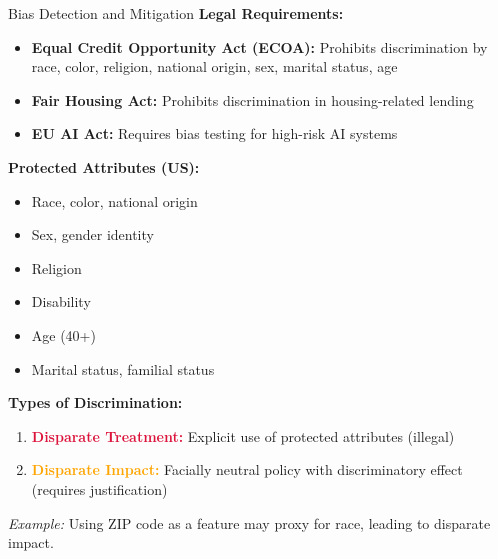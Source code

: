 \begin{frame}{Bias Detection and Mitigation}
\textbf{Legal Requirements:}
\begin{itemize}
\item \textbf{Equal Credit Opportunity Act (ECOA):} Prohibits discrimination by race, color, religion, national origin, sex, marital status, age
\item \textbf{Fair Housing Act:} Prohibits discrimination in housing-related lending
\item \textbf{EU AI Act:} Requires bias testing for high-risk AI systems
\end{itemize}

\vspace{0.3cm}
\textbf{Protected Attributes (US):}
\begin{itemize}
\item Race, color, national origin
\item Sex, gender identity
\item Religion
\item Disability
\item Age (40+)
\item Marital status, familial status
\end{itemize}

\vspace{0.3cm}
\textbf{Types of Discrimination:}
\begin{enumerate}
\item \textcolor{crimson}{\textbf{Disparate Treatment:}} Explicit use of protected attributes (illegal)
\item \textcolor{orange}{\textbf{Disparate Impact:}} Facially neutral policy with discriminatory effect (requires justification)
\end{enumerate}

\textit{Example:} Using ZIP code as a feature may proxy for race, leading to disparate impact.
\end{frame}

